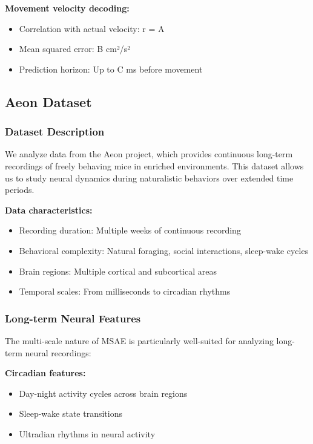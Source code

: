 \textbf{Movement velocity decoding:}
\begin{itemize}
\item Correlation with actual velocity: r = A
\item Mean squared error: B cm²/s²
\item Prediction horizon: Up to C ms before movement
\end{itemize}

\subsection{Aeon Dataset}

\subsubsection{Dataset Description}

We analyze data from the Aeon project, which provides continuous long-term recordings of freely behaving mice in enriched environments. This dataset allows us to study neural dynamics during naturalistic behaviors over extended time periods.

\textbf{Data characteristics:}
\begin{itemize}
\item Recording duration: Multiple weeks of continuous recording
\item Behavioral complexity: Natural foraging, social interactions, sleep-wake cycles
\item Brain regions: Multiple cortical and subcortical areas
\item Temporal scales: From milliseconds to circadian rhythms
\end{itemize}

\subsubsection{Long-term Neural Features}

The multi-scale nature of MSAE is particularly well-suited for analyzing long-term neural recordings:

\textbf{Circadian features:}
\begin{itemize}
\item Day-night activity cycles across brain regions
\item Sleep-wake state transitions
\item Ultradian rhythms in neural activity
\end{itemize}

